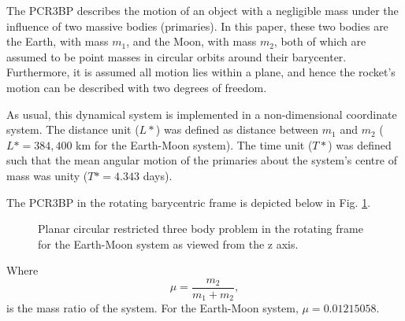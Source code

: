 \documentclass[10pt,twocolumn]{revtex4-2}    %
\begin{document}
The PCR3BP describes the motion of an object with a negligible mass under the influence of two massive bodies (primaries). In this paper, these two bodies are the Earth, with mass $m_1$, and the Moon, with mass $m_2$, both of which are assumed to be point masses in circular orbits around their barycenter. Furthermore, it is assumed all motion lies within a plane, and hence the rocket's motion can be described with two degrees of freedom.

As usual, this dynamical system is implemented in a non-dimensional coordinate system. The distance unit ($L*$) was defined as distance between $m_1$ and $m_2$ ($L* = 384,400$ km for the Earth-Moon system). The time unit ($T*$) was defined such that the mean angular motion of the primaries about the system's centre of mass was unity ($T* = 4.343$ days).

The PCR3BP in the rotating barycentric frame is depicted below in Fig. \ref{fig:cr3bp}. 

\vspace{1em}
\begin{figure}[h]
    \centering
    \caption{Planar circular restricted three body problem in the rotating frame for the Earth-Moon system as viewed from the z axis.}
    \label{fig:cr3bp}
\end{figure}

Where 
\begin{equation}
    \mu = \frac{m_2}{m_1 + m_2},
\end{equation}
is the mass ratio of the system. For the Earth-Moon system, $\mu = 0.01215058$.
\end{document}
